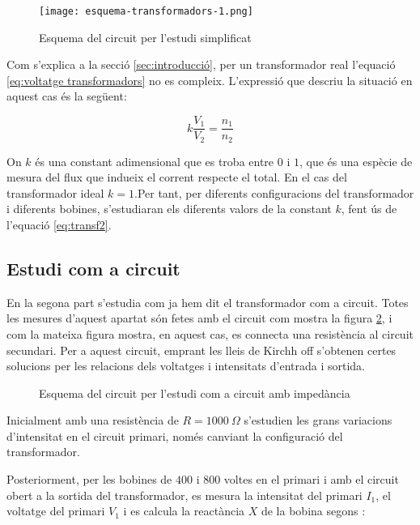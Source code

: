 \begin{figure}[htb]
    \centering \small \sffamily
    \texttt{[image: esquema-transformadors-1.png]}
    \caption{Esquema del circuit per l'estudi simplificat}
    \label{fig:esq1}
\end{figure}

Com s'explica a la secció \cref{sec:introducció}, per un transformador real l'equació \cref{eq:voltatge transformadors} no es compleix. L'expressió que descriu la situació en aquest cas és la següent:

\begin{equation}\label{eq:transf2}
     k\frac{V_1}{V_2}=\frac{n_1}{n_2}
\end{equation}

On $k$ és una constant adimensional que es troba entre $0$ i $1$, que és una espècie de mesura del flux que indueix el corrent respecte el total. En el cas del transformador ideal $k=1$.Per tant, per diferents configuracions del transformador i diferents bobines, s'estudiaran els diferents valors de la constant $k$, fent ús de l'equació \cref{eq:transf2}.

\subsection{Estudi com a circuit}\label{sec:metcirc}

En la segona part s'estudia com ja hem dit el transformador com a circuit. Totes les mesures d'aquest apartat són fetes amb el circuit com mostra la figura \cref{fig:esq2}, i com la mateixa figura mostra, en aquest cas, es connecta una resistència al circuit secundari. Per a aquest circuit, emprant les lleis de Kirchh
off s'obtenen certes solucions per les relacions dels voltatges i intensitats d'entrada i sortida. 

\begin{figure}[htbp!]
    \centering \small \sffamily
    \caption{Esquema del circuit per l'estudi com a circuit amb impedància}
    \label{fig:esq2}
\end{figure}

Inicialment amb una resistència de $R=\SI{1000}{\Omega}$ s'estudien les grans variacions d'intensitat en el circuit primari, només canviant la configuració del transformador. 

Posteriorment, per les bobines de $400$ i $800$ voltes en el primari i amb el circuit obert a la sortida del transformador, es mesura  la intensitat del primari $I_1$, el voltatge del primari $V_1$ i es calcula la reactància $X$ de la bobina segons :

